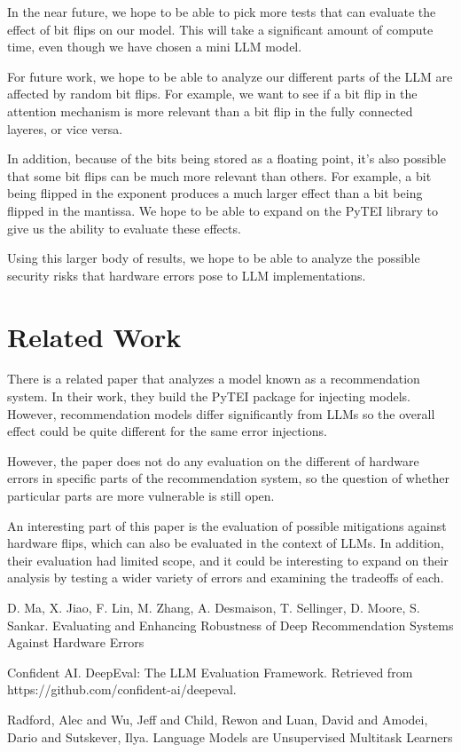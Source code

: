 \documentclass[a4paper]{article}
\begin{document}
In the near future, we hope to be able to pick more tests that can evaluate the effect of bit flips on our model. This will take a significant amount of compute time, even though we have chosen a mini LLM model.

For future work, we hope to be able to analyze our different parts of the LLM are affected by random bit flips. For example, we want to see if a bit flip in the attention mechanism is more relevant than a bit flip in the fully connected layeres, or vice versa. 

In addition, because of the bits being stored as a floating point, it's also possible that some bit flips can be much more relevant than others. For example, a bit being flipped in the exponent produces a much larger effect than a bit being flipped in the mantissa. We hope to be able to expand on the PyTEI library to give us the ability to evaluate these effects.

Using this larger body of results, we hope to be able to analyze the possible security risks that hardware errors pose to LLM implementations.

\section{Related Work}
There is a related paper \cite{Ma23} that analyzes a model known as a recommendation system. In their work, they build the PyTEI package for injecting models. However, recommendation models differ significantly from LLMs so the overall effect could be quite different for the same error injections.

However, the paper does not do any evaluation on the different of hardware errors in specific parts of the recommendation system, so the question of whether particular parts are more vulnerable is still open.

An interesting part of this paper is the evaluation of possible mitigations against hardware flips, which can also be evaluated in the context of LLMs. In addition, their evaluation had limited scope, and it could be interesting to expand on their analysis by testing a wider variety of errors and examining the tradeoffs of each.



% 
%

\begin{thebibliography}{Com79}
 D. Ma, X. Jiao, F. Lin, M. Zhang, A. Desmaison, T. Sellinger, D. Moore, S. Sankar.
\newblock Evaluating and Enhancing Robustness of Deep Recommendation Systems Against Hardware Errors

 Confident AI.
\newblock DeepEval: The LLM Evaluation Framework. Retrieved from https://github.com/confident-ai/deepeval.

 Radford, Alec and Wu, Jeff and Child, Rewon and Luan, David and Amodei, Dario and Sutskever, Ilya. 
\newblock Language Models are Unsupervised Multitask Learners
\end{thebibliography}
\end{document}
